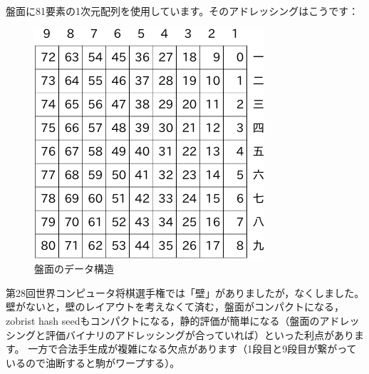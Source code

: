 \documentclass[10pt,a4paper]{ltjsarticle}
\begin{document}
盤面に81要素の1次元配列を使用しています。そのアドレッシングはこうです：
\begin{figure}[H]
  \centering
  \includegraphics{fig/fig1.pdf}
  \caption{盤面のデータ構造}
\end{figure}

第28回世界コンピュータ将棋選手権では「壁」がありましたが，なくしました。
壁がないと，壁のレイアウトを考えなくて済む，盤面がコンパクトになる，zobrist hash seedもコンパクトになる，静的評価が簡単になる（盤面のアドレッシングと評価バイナリのアドレッシングが合っていれば）といった利点があります。
一方で合法手生成が複雑になる欠点があります（1段目と9段目が繋がっているので油断すると駒がワープする）。
\end{document}
